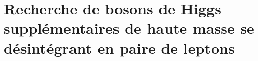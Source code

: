 \chapter[Recherche de bosons de Higgs supplémentaires de haute masse]{Recherche de bosons de Higgs supplémentaires de haute masse se désintégrant en paire de leptons~\tau}\label{chapter-HTT_analysis}









